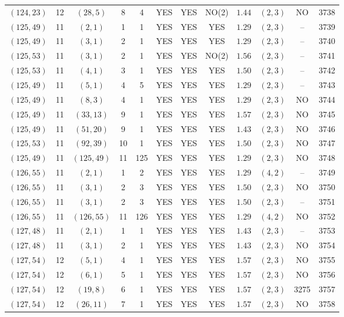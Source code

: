 \begin{longtable}{|c|c|c|c|c|c|c|c|c|c|c|c|}
$(124,23)$ & 12 & $(28,5)$ & 8 & 4 & YES & YES & NO(2) & $1.44$ & $(2,3)$ & NO & 3738\\
$(125,49)$ & 11 & $(2,1)$ & 1 & 1 & YES & YES & YES & $1.29$ & $(2,3)$ & -- & 3739\\
$(125,49)$ & 11 & $(3,1)$ & 2 & 1 & YES & YES & YES & $1.29$ & $(2,3)$ & -- & 3740\\
$(125,53)$ & 11 & $(3,1)$ & 2 & 1 & YES & YES & NO(2) & $1.56$ & $(2,3)$ & -- & 3741\\
$(125,53)$ & 11 & $(4,1)$ & 3 & 1 & YES & YES & YES & $1.50$ & $(2,3)$ & -- & 3742\\
$(125,49)$ & 11 & $(5,1)$ & 4 & 5 & YES & YES & YES & $1.29$ & $(2,3)$ & -- & 3743\\
$(125,49)$ & 11 & $(8,3)$ & 4 & 1 & YES & YES & YES & $1.29$ & $(2,3)$ & NO & 3744\\
$(125,49)$ & 11 & $(33,13)$ & 9 & 1 & YES & YES & YES & $1.57$ & $(2,3)$ & NO & 3745\\
$(125,49)$ & 11 & $(51,20)$ & 9 & 1 & YES & YES & YES & $1.43$ & $(2,3)$ & NO & 3746\\
$(125,53)$ & 11 & $(92,39)$ & 10 & 1 & YES & YES & YES & $1.50$ & $(2,3)$ & NO & 3747\\
$(125,49)$ & 11 & $(125,49)$ & 11 & 125 & YES & YES & YES & $1.29$ & $(2,3)$ & NO & 3748\\
$(126,55)$ & 11 & $(2,1)$ & 1 & 2 & YES & YES & YES & $1.29$ & $(4,2)$ & -- & 3749\\
$(126,55)$ & 11 & $(3,1)$ & 2 & 3 & YES & YES & YES & $1.50$ & $(2,3)$ & NO & 3750\\
$(126,55)$ & 11 & $(3,1)$ & 2 & 3 & YES & YES & YES & $1.50$ & $(2,3)$ & -- & 3751\\
$(126,55)$ & 11 & $(126,55)$ & 11 & 126 & YES & YES & YES & $1.29$ & $(4,2)$ & NO & 3752\\
$(127,48)$ & 11 & $(2,1)$ & 1 & 1 & YES & YES & YES & $1.43$ & $(2,3)$ & -- & 3753\\
$(127,48)$ & 11 & $(3,1)$ & 2 & 1 & YES & YES & YES & $1.43$ & $(2,3)$ & NO & 3754\\
$(127,54)$ & 12 & $(5,1)$ & 4 & 1 & YES & YES & YES & $1.57$ & $(2,3)$ & NO & 3755\\
$(127,54)$ & 12 & $(6,1)$ & 5 & 1 & YES & YES & YES & $1.57$ & $(2,3)$ & NO & 3756\\
$(127,54)$ & 12 & $(19,8)$ & 6 & 1 & YES & YES & YES & $1.57$ & $(2,3)$ & 3275 & 3757\\
$(127,54)$ & 12 & $(26,11)$ & 7 & 1 & YES & YES & YES & $1.57$ & $(2,3)$ & NO & 3758\\

\end{longtable}
